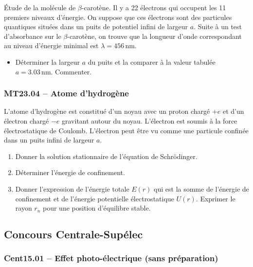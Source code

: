 Étude de la molécule de $\beta$-carotène. Il y a 22 électrons qui occupent les 11 premiers niveaux d'énergie. On suppose que ces électrons sont des particules quantiques situées dans un puits de potentiel infini de largeur $a$. Suite à un test d'absorbance sur le $\beta$-carotène, on trouve que la longueur d'onde correspondant au niveau d'énergie minimal est $\lambda = 456\,\text{nm}$.

\begin{center}
\end{center}

\begin{itemize}[label=\textbullet]
\item Déterminer la largeur $a$ du puits et la comparer à la valeur tabulée $a = 3.03\,\text{nm}$. Commenter.
\end{itemize}

\newpage
\subsubsection*{MT23.04 -- Atome d'hydrogène }

L'atome d'hydrogène est constitué d'un noyau avec un proton chargé $+e$ et d'un électron chargé $-e$ gravitant autour du noyau. L'électron est soumis à la force électrostatique de Coulomb. L'électron peut être vu comme une particule confinée dans un puits infini de largeur $a$.

\begin{enumerate}
\item Donner la solution stationnaire de l'équation de Schrödinger.
\item Déterminer l'énergie de confinement.
\item Donner l'expression de l'énergie totale $E(r)$ qui est la somme de l'énergie de confinement et de l'énergie potentielle électrostatique $U(r)$. Exprimer le rayon $r_{n}$ pour une position d'équilibre stable.
\end{enumerate}

\newpage
\subsection*{Concours Centrale-Supélec}

\subsubsection*{Cent15.01 -- Effet photo-électrique (sans préparation)  \corrige}

